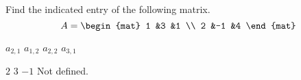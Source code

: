 
\begin{Exercise}[
name={},
title={}, 
difficulty=0,
origin={\cite{JH}}]
Find the indicated entry of the following matrix.
\begin{equation*}
A=\begin{mat}
1  &3  &1  \\
2  &-1 &4
\end{mat}
\end{equation*}
\begin{multicols}{4}
\Question \( a_{2,1} \) 
\Question \( a_{1,2} \)  
\Question \( a_{2,2} \)
\Question \( a_{3,1} \) 
\EndCurrentQuestion
\end{multicols}

\end{Exercise}

\begin{Answer}
\Question $2$
\Question $3$
\Question $-1$
\Question Not defined.
\end{Answer}
